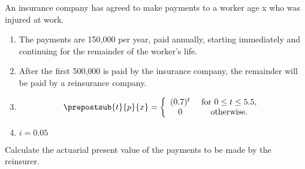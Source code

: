  An insurance company has agreed to make payments to a worker age 
x who was injured at work.
\begin{enumerate}
\item The payments are 150,000 per year, paid annually, starting immediately 
and continuing for the remainder of the worker's life.
\item After the first 500,000 is paid by the insurance company, 
the remainder will be paid by a reinsurance company.
\item 
 \[
   \prepostsub{t}{p}{x} = \left\{\begin{array}{cc}
     (0.7)^t & \mbox{ for }0\leq t \leq 5.5, \\
      0      & \mbox{ otherwise.}
   \end{array}\right.
\]
\item $i = 0.05$
\end{enumerate}

\bigskip
Calculate the actuarial present value of the payments to be made by the 
reinsurer.


